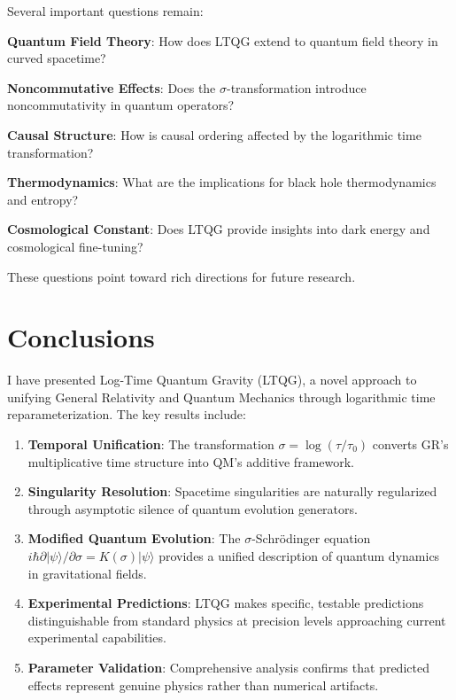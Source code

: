\documentclass[12pt,a4paper]{article}
\begin{document}
Several important questions remain:

\textbf{Quantum Field Theory}: How does LTQG extend to quantum field theory in curved spacetime?

\textbf{Noncommutative Effects}: Does the $\sigma$-transformation introduce noncommutativity in quantum operators?

\textbf{Causal Structure}: How is causal ordering affected by the logarithmic time transformation?

\textbf{Thermodynamics}: What are the implications for black hole thermodynamics and entropy?

\textbf{Cosmological Constant}: Does LTQG provide insights into dark energy and cosmological fine-tuning?

These questions point toward rich directions for future research.

\section{Conclusions}

I have presented Log-Time Quantum Gravity (LTQG), a novel approach to unifying General Relativity and Quantum Mechanics through logarithmic time reparameterization. The key results include:

\begin{enumerate}
\item \textbf{Temporal Unification}: The transformation $\sigma = \log(\tau/\tau_0)$ converts GR's multiplicative time structure into QM's additive framework.

\item \textbf{Singularity Resolution}: Spacetime singularities are naturally regularized through asymptotic silence of quantum evolution generators.

\item \textbf{Modified Quantum Evolution}: The $\sigma$-Schrödinger equation $i\hbar \partial|\psi\rangle/\partial\sigma = K(\sigma)|\psi\rangle$ provides a unified description of quantum dynamics in gravitational fields.

\item \textbf{Experimental Predictions}: LTQG makes specific, testable predictions distinguishable from standard physics at precision levels approaching current experimental capabilities.

\item \textbf{Parameter Validation}: Comprehensive analysis confirms that predicted effects represent genuine physics rather than numerical artifacts.
\end{enumerate}
\end{document}
